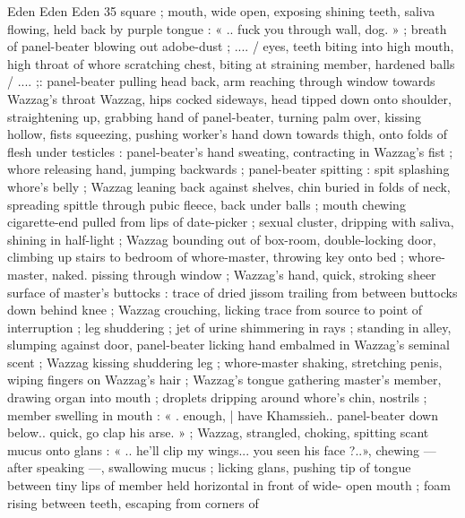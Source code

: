 Eden Eden Eden 35
square ; mouth, wide open, exposing shining teeth, saliva flowing,
held back by purple tongue : « .. fuck you through wall, dog. » ;
breath of panel-beater blowing out adobe-dust ; .... / eyes, teeth
biting into high mouth, high throat of whore scratching chest, biting
at straining member, hardened balls / .... ;: panel-beater pulling head
back, arm reaching through window towards Wazzag's throat
Wazzag, hips cocked sideways, head tipped down onto shoulder,
straightening up, grabbing hand of panel-beater, turning palm over,
kissing hollow, fists squeezing, pushing worker's hand down towards
thigh, onto folds of flesh under testicles : panel-beater's hand
sweating, contracting in Wazzag's fist ; whore releasing hand,
jumping backwards ; panel-beater spitting : spit splashing whore's
belly ; Wazzag leaning back against shelves, chin buried in folds of
neck, spreading spittle through pubic fleece, back under balls ;
mouth chewing cigarette-end pulled from lips of date-picker ; sexual
cluster, dripping with saliva, shining in half-light ; Wazzag bounding
out of box-room, double-locking door, climbing up stairs to bedroom
of whore-master, throwing key onto bed ; whore-master, naked.
pissing through window ; Wazzag's hand, quick, stroking sheer
surface of master's buttocks : trace of dried jissom trailing from
between buttocks down behind knee ; Wazzag crouching, licking
trace from source to point of interruption ; leg shuddering ; jet of
urine shimmering in rays ; standing in alley, slumping against door,
panel-beater licking hand embalmed in Wazzag's seminal scent ;
Wazzag kissing shuddering leg ; whore-master shaking, stretching
penis, wiping fingers on Wazzag's hair ; Wazzag's tongue gathering
master's member, drawing organ into mouth ; droplets dripping
around whore's chin, nostrils ; member swelling in mouth : « .
enough, | have Khamssieh.. panel-beater down below.. quick, go clap
his arse. » ; Wazzag, strangled, choking, spitting scant mucus onto
glans : « .. he'll clip my wings... you seen his face ?..», chewing —
after speaking —, swallowing mucus ; licking glans, pushing tip of
tongue between tiny lips of member held horizontal in front of wide-
open mouth ; foam rising between teeth, escaping from corners of

